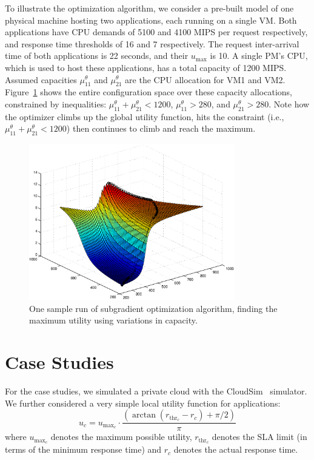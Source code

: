 To illustrate the optimization algorithm, we consider a pre-built model of one physical machine hosting two applications, each running on a single VM. Both applications have CPU demands of 5100 and 4100 MIPS per request respectively, and response time thresholds of 16 and 7 respectively. The request inter-arrival time of both applications is 22 seconds, and their $u_{\text{max}}$ is 10.  A single PM's CPU, which is used to host these applications, has a total capacity of 1200 MIPS.
 Assumed capacities $\mu^\theta_{11}$ and $\mu^\theta_{21}$ are the CPU allocation for VM1 and VM2. Figure~\ref{fig:sample-config-space-for-subgradient-optimization} shows the entire configuration space over these capacity allocations, constrained by inequalities:
 $\mu^\theta_{11}+\mu^\theta_{21}<1200$, $\mu^\theta_{11}>280$, and $\mu^\theta_{21}>280$.
Note how the optimizer climbs up the global utility function, hits the constraint (i.e., $\mu^\theta_{11}+\mu^\theta_{21}<1200$) then continues to climb and reach the maximum.

\begin{figure}[h]
	\centering
		\includegraphics[width=0.8\textwidth]{image/centralized1/twoVM_1PM_optimality}
		\caption{One sample run of subgradient optimization algorithm, finding the
		maximum utility using variations in capacity.}   
	\label{fig:sample-config-space-for-subgradient-optimization}
\end{figure} 


\section{Case Studies}
\label{sec:case-studies}
For the case studies, we simulated a private cloud with the CloudSim~\cite{CLOUDSIM2010} simulator. 
We further considered a very simple local utility function for applications:
\begin{equation} \label{eq:local-utility-formula}
u_c = u_{{\text{max}}_c}\cdot\frac{\left(\arctan(r_{\text{thr}_c}-r_c)+ \pi/2\right)}{\pi} 
\end{equation}
where $u_{{\text{max}}_c}$ denotes the maximum possible utility, $r_{\text{thr}_c}$ denotes the SLA limit (in terms of the minimum response time) and
$r_c$ denotes the actual response time.

